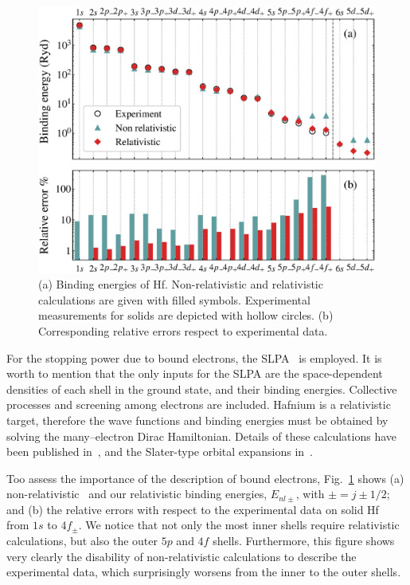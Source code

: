\documentclass[aps,pra,reprint,groupedaddress]{revtex4-1}
\begin{document}
\begin{figure}[!t]
\centering
\includegraphics[width=11.cm]{bindener.eps}
\caption{(a) Binding energies of Hf. Non-relativistic and relativistic calculations are given with filled symbols.  Experimental measurements for solids\cite{williams1995} are depicted with hollow circles. (b) Corresponding relative errors respect to experimental data.}
\label{Binding_E}
\end{figure}

For the stopping power due to bound electrons, the SLPA~\cite{mon17,mon13} is employed. It is worth to mention that the only inputs for the SLPA are the space-dependent densities of each shell in the ground state, and their binding energies. Collective processes and screening among electrons are included. Hafnium is a relativistic target, therefore the wave functions and binding energies must be obtained by solving the many–electron Dirac Hamiltonian. Details of these calculations have been published in~\cite{mendez2019}, and the Slater-type orbital expansions in~\cite{Hf_arxiv}.

Too assess the importance of the description of bound electrons, Fig.~\ref{Binding_E} shows (a) non-relativistic~\cite{badnell97} and our relativistic binding energies, $E_{nl\pm}$, with $\pm=j\pm1/2$; and (b) the relative errors with respect to the experimental data on solid Hf~\cite{williams1995} from $1s$ to $4f_{\pm}$. We notice that not only the most inner shells require relativistic calculations, but also the outer $5p$ and $4f$ shells. 
Furthermore, this figure shows very clearly the disability of non-relativistic calculations to describe the experimental data, which surprisingly worsens from the inner to the outer shells. 
\end{document}
